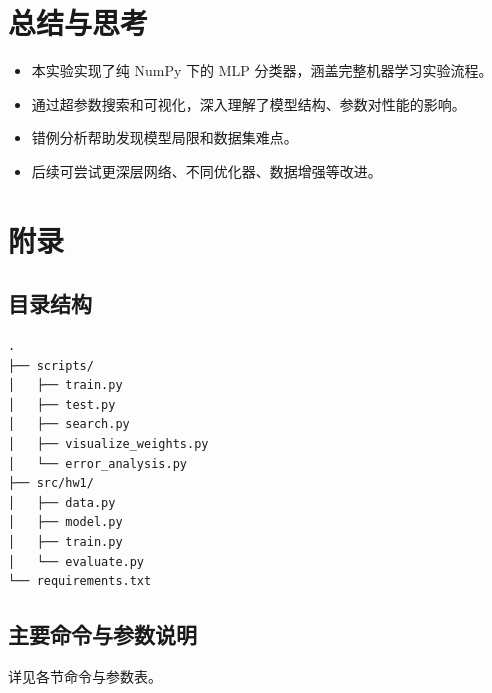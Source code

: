 \documentclass[12pt]{article}
\begin{document}
\section{总结与思考}
\begin{itemize}
  \item 本实验实现了纯 NumPy 下的 MLP 分类器，涵盖完整机器学习实验流程。
  \item 通过超参数搜索和可视化，深入理解了模型结构、参数对性能的影响。
  \item 错例分析帮助发现模型局限和数据集难点。
  \item 后续可尝试更深层网络、不同优化器、数据增强等改进。
\end{itemize}

\section*{附录}
\subsection*{目录结构}
\begin{verbatim}
.
├── scripts/
│   ├── train.py
│   ├── test.py
│   ├── search.py
│   ├── visualize_weights.py
│   └── error_analysis.py
├── src/hw1/
│   ├── data.py
│   ├── model.py
│   ├── train.py
│   └── evaluate.py
└── requirements.txt
\end{verbatim}

\subsection*{主要命令与参数说明}
详见各节命令与参数表。
\end{document}

